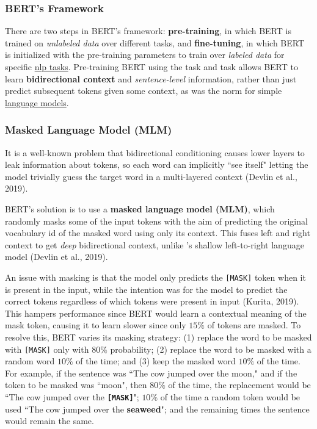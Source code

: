 \subsubsection{BERT's Framework}
 
There are two steps in BERT's framework: \textbf{pre-training}, in which BERT is trained on \emph{unlabeled data} over different tasks, and \textbf{fine-tuning}, in which BERT is initialized with the pre-training parameters to train over \emph{labeled data} for specific \hyperref[app:Appendix_NLPTasks]{nlp tasks}. Pre-training BERT using the  task and  task allows BERT to learn \textbf{bidirectional context} and \emph{sentence-level} information, rather than just predict subsequent tokens given some context, as was the norm for simple \hyperref[sec:LanguageModels]{language models}.


\subsubsection{Masked Language Model (MLM)} \label{sec:maskedlanguagemodelMLM}

It is a well-known problem that bidirectional conditioning causes lower layers to leak information about tokens, so each word can implicitly ``see itself" letting the model trivially guess the target word in a multi-layered context (Devlin et al., 2019).  

BERT's solution is to use a \textbf{masked language model (MLM)}, which randomly masks some of the input tokens with the aim of predicting the original vocabulary id of the masked word using only its context. This fuses left and right context to get \emph{deep} bidirectional context, unlike 's shallow left-to-right language model (Devlin et al., 2019).  

An issue with masking is that the model only predicts the \texttt{[MASK]} token when it is present in the input, while the intention was for the model to predict the correct tokens regardless of which tokens were present in input (Kurita, 2019). This hampers performance since BERT would learn a contextual meaning of the mask token, causing it to learn slower since only $15 \%$ of tokens are masked. To resolve this, BERT varies its masking strategy: (1) replace the word to be masked with \texttt{[MASK]} only with $80\%$ probability; (2) replace the word to be masked with a random word $10 \%$ of the time; and (3) keep the masked word $10 \%$ of the time. For example, if the sentence was ``The cow jumped over the moon," and if the token to be masked was ``moon", then $80 \%$ of the time, the replacement would be ``The cow jumped over the \textbf{\texttt{[MASK]}}"; $10 \%$ of the time a random token would be used ``The cow jumped over the \textbf{seaweed}"; and the remaining times the sentence would remain the same. 



